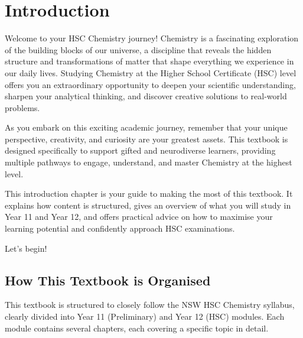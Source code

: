 \chapter{Introduction}

\begin{fullwidth}
\noindent Welcome to your HSC Chemistry journey! Chemistry is a fascinating exploration of the building blocks of our universe, a discipline that reveals the hidden structure and transformations of matter that shape everything we experience in our daily lives. Studying Chemistry at the Higher School Certificate (HSC) level offers you an extraordinary opportunity to deepen your scientific understanding, sharpen your analytical thinking, and discover creative solutions to real-world problems.

As you embark on this exciting academic journey, remember that your unique perspective, creativity, and curiosity are your greatest assets. This textbook is designed specifically to support gifted and neurodiverse learners, providing multiple pathways to engage, understand, and master Chemistry at the highest level.

This introduction chapter is your guide to making the most of this textbook. It explains how content is structured, gives an overview of what you will study in Year 11 and Year 12, and offers practical advice on how to maximise your learning potential and confidently approach HSC examinations.

Let's begin!
\end{fullwidth}

\section{How This Textbook is Organised}
\FloatBarrier
\FloatBarrier
\FloatBarrier

This textbook is structured to closely follow the NSW HSC Chemistry syllabus, clearly divided into Year 11 (Preliminary) and Year 12 (HSC) modules. Each module contains several chapters, each covering a specific topic in detail.


